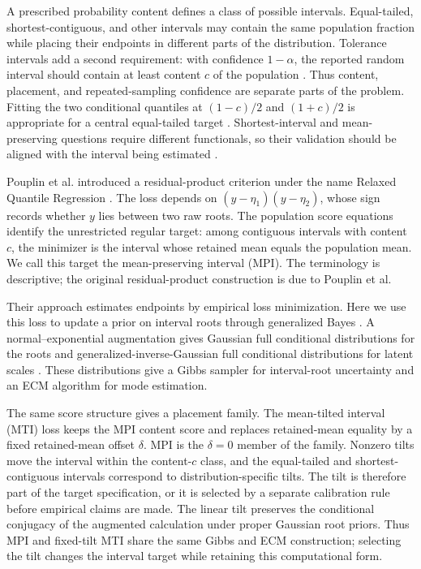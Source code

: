 \documentclass[11pt]{article}
\numberwithin{equation}{section}
\newcounter{algorithm}
\begin{document}
A prescribed probability content defines a class of possible intervals. Equal-tailed,
shortest-contiguous, and other intervals may contain the same population fraction
while placing their endpoints in different parts of the distribution. Tolerance
intervals add a second requirement: with confidence \(1-\alpha\), the reported
random interval should contain at least content \(c\) of the population
\citep{Wilks1941ToleranceLimits,Wilks1942StatisticalPrediction,Robbins1944DistributionFreeTolerance}.
Thus content, placement, and repeated-sampling confidence are separate parts of
the problem. Fitting the two conditional quantiles at \((1-c)/2\) and
\((1+c)/2\) is appropriate for a central equal-tailed target
\citep{KoenkerBassett1978}. Shortest-interval and mean-preserving questions
require different functionals, so their validation should be aligned with the
interval being estimated \citep{BrehmerGneiting2021Intervals,FisslerEtAl2021SetValued}.

Pouplin et al. introduced a residual-product criterion under the name Relaxed
Quantile Regression \citep{PouplinEtAl2024RQR}. The loss depends on
\((y-\eta_1)(y-\eta_2)\), whose sign records whether \(y\) lies between two raw
roots. The population score equations identify the unrestricted regular target:
among contiguous intervals with content \(c\), the minimizer is the interval
whose retained mean equals the population mean. We call this target the
mean-preserving interval (MPI). The terminology is descriptive; the original
residual-product construction is due to Pouplin et al.

Their approach estimates endpoints by empirical loss minimization. Here we
use this loss to update a prior on interval roots through generalized Bayes
\citep{BissiriHolmesWalker2016GeneralBayes}. A normal--exponential augmentation
gives Gaussian full conditional distributions for the roots and
generalized-inverse-Gaussian full conditional distributions for latent scales
\citep{KozumiKobayashi2011Gibbs}. These distributions give a Gibbs sampler
for interval-root uncertainty and an ECM algorithm for mode estimation.

The same score structure gives a placement family. The mean-tilted interval
(MTI) loss keeps the MPI content score and replaces retained-mean equality by a
fixed retained-mean offset \(\delta\). MPI is the \(\delta=0\) member of the
family. Nonzero tilts move the interval within the content-\(c\) class, and the
equal-tailed and shortest-contiguous intervals correspond to
distribution-specific tilts. The tilt is therefore part of the target
specification, or it is selected by a separate calibration rule before empirical
claims are made.
The linear tilt preserves the conditional conjugacy of the augmented
calculation under proper Gaussian root priors. Thus MPI and fixed-tilt MTI
share the same Gibbs and ECM construction; selecting the tilt changes the
interval target while retaining this computational form.
\end{document}
